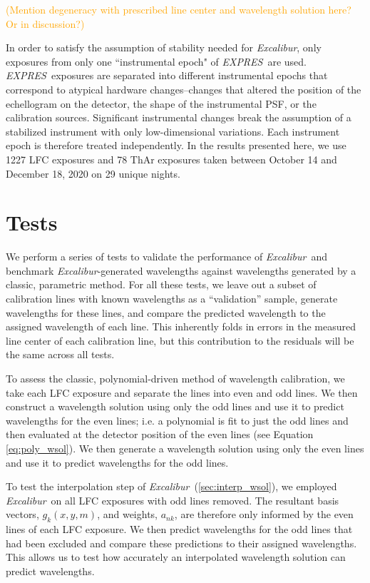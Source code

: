 \documentclass[modern]{aastex63}
\newcommand{\project}[1]{\textsl{#1}}
\newcommand{\name}{\project{Excalibur}}
\newcommand{\acronym}[1]{{\small{#1}}}
\newcommand{\expres}{\project{\acronym{EXPRES}}}
\newcommand{\lz}[1]{\textcolor{orange}{#1}}
\begin{document}
 \lz{(Mention degeneracy with prescribed line center and wavelength solution here?  Or in discussion?)}
 
In order to satisfy the assumption of stability needed for \name, only exposures from only one ``instrumental epoch" of \expres\ are used.   \expres\ exposures are separated into different instrumental epochs that correspond to atypical hardware changes--changes that altered the position of the echellogram on the detector, the shape of the instrumental PSF, or the calibration sources.  Significant instrumental changes break the assumption of a stabilized instrument with only low-dimensional variations.  Each instrument epoch is therefore treated independently.  In the results presented here, we use 1227 LFC exposures and 78 ThAr exposures taken between October 14 and December 18, 2020 on 29 unique nights.


\section{Tests}\label{sec:tests}
We perform a series of tests to validate the performance of \name\ and benchmark \name -generated wavelengths against wavelengths generated by a classic, parametric method.  For all these tests, we leave out a subset of calibration lines with known wavelengths as a ``validation'' sample, generate wavelengths for these lines, and compare the predicted wavelength to the assigned wavelength of each line.  This inherently folds in errors in the measured line center of each calibration line, but this contribution to the residuals will be the same across all tests.

To assess the classic, polynomial-driven method of wavelength calibration, we take each LFC exposure and separate the lines into even and odd lines.  We then construct a wavelength solution using only the odd lines and use it to predict wavelengths for the even lines; i.e. a polynomial is fit to just the odd lines and then evaluated at the detector position of the even lines (see Equation \ref{eq:poly_wsol}).  We then generate a wavelength solution using only the even lines and use it to predict wavelengths for the odd lines.

To test the interpolation step of \name\ (\textsection \ref{sec:interp_wsol}), we employed \name\ on all LFC exposures with odd lines removed.  The resultant basis vectors, $g_k(x,y,m)$,  and weights, $a_{nk}$, are therefore only informed by the even lines of each LFC exposure.  We then predict wavelengths for the odd lines that had been excluded and compare these predictions to their assigned wavelengths.  This allows us to test how accurately an interpolated wavelength solution can predict wavelengths.
\end{document}
